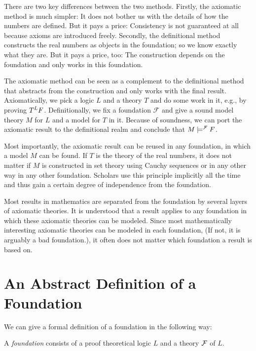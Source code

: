 There are two key differences between the two methods. Firstly, the axiomatic method is much simpler: It does not bother us with the details of how the numbers are defined. But it pays a price: Consistency is not guaranteed at all because axioms are introduced freely.
Secondly, the definitional method constructs the real numbers as objects in the foundation; so we know exactly what they are. But it pays a price, too: The construction depends on the foundation and only works in this foundation.

The axiomatic method can be seen as a complement to the definitional method that abstracts from the construction and only works with the final result. Axiomatically, we pick a logic $L$ and a theory $T$ and do some work in it, e.g., by proving $T^L F$. Definitionally, we fix a foundation $\mathcal{F}$ and give a sound model theory $M$ for $L$ and a model for $T$ in it. Because of soundness, we can port the axiomatic result to the definitional realm and conclude that $M\models^{\mathcal{F}} F$.

Most importantly, the axiomatic result can be reused in any foundation, in which a model $M$ can be found. If $T$ is the theory of the real numbers, it does not matter if $M$ is constructed in set theory using Cauchy sequences or in any other way in any other foundation. Scholars use this principle implicitly all the time and thus gain a certain degree of independence from the foundation.

Most results in mathematics are separated from the foundation by several layers of axiomatic theories. It is understood that a result applies to any foundation in which these axiomatic theories can be modeled. Since most mathematically interesting axiomatic theories can be modeled in each foundation, (If not, it is arguably a bad foundation.), it often does not matter which foundation a result is based on.

\section{An Abstract Definition of a Foundation}\label{sec:found:abs}

We can give a formal definition of a foundation in the following way:

\begin{definition}[Foundation]
A \emph{foundation} consists of a proof theoretical logic $L$ and a theory $\mathcal{F}$ of $L$.
\end{definition}

